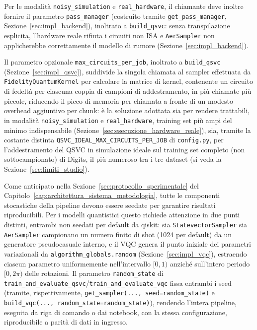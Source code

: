 Per le modalità \texttt{noisy\_simulation} e \texttt{real\_hardware}, il chiamante deve inoltre fornire il parametro \texttt{pass\_manager} (costruito tramite \texttt{get\_pass\_manager}, Sezione~\ref{sec:impl_backend}), inoltrato a \texttt{build\_qsvc}: senza transpilazione esplicita, l'hardware reale rifiuta i circuiti non ISA e \texttt{AerSampler} non applicherebbe correttamente il modello di rumore (Sezione~\ref{sec:impl_backend}).

Il parametro opzionale \texttt{max\_circuits\_per\_job}, inoltrato a \texttt{build\_qsvc} (Sezione~\ref{sec:impl_qsvc}), suddivide la singola chiamata al sampler effettuata da \newline\texttt{FidelityQuantumKernel} per calcolare la matrice di kernel, contenente un circuito di fedeltà per ciascuna coppia di campioni di addestramento, in più chiamate più piccole, riducendo il picco di memoria per chiamata a fronte di un modesto overhead aggiuntivo per chunk: è la soluzione adottata sia per rendere trattabili, in modalità \texttt{noisy\_simulation} e \texttt{real\_hardware}, training set più ampi del minimo indispensabile (Sezione~\ref{sec:esecuzione_hardware_reale}), sia, tramite la costante distinta \texttt{QSVC\_IDEAL\_MAX\_CIRCUITS\_PER\_JOB} di \texttt{config.py}, per l'addestramento del QSVC in simulazione ideale sul training set completo (non sottocampionato) di Digits, il più numeroso tra i tre dataset (si veda la Sezione~\ref{sec:limiti_studio}).

Come anticipato nella Sezione~\ref{sec:protocollo_sperimentale} del Capitolo~\ref{cap:architettura_sistema_metodologia}, tutte le componenti stocastiche della pipeline devono essere seedate per garantire risultati riproducibili. Per i modelli quantistici questo richiede attenzione in due punti distinti, entrambi non seedati per default da qiskit: sia \texttt{StatevectorSampler} sia \texttt{AerSampler} campionano un numero finito di shot (1024 per default) da un generatore pseudocasuale interno, e il VQC genera il punto iniziale dei parametri variazionali da \texttt{algorithm\_globals.random} (Sezione~\ref{sec:impl_vqc}), estraendo ciascun parametro uniformemente nell'intervallo $[0, 1)$ anziché sull'intero periodo $[0, 2\pi)$ delle rotazioni. Il parametro \texttt{random\_state} di \texttt{train\_and\_evaluate\_qsvc}/\texttt{train\_and\_evaluate\_vqc} fissa entrambi i seed (tramite, rispettivamente, \texttt{get\_sampler(..., seed=random\_state)} e \newline\texttt{build\_vqc(..., random\_state=random\_state)}), rendendo l'intera pipeline, \newline eseguita da riga di comando o dai notebook, con la stessa configurazione, riproducibile a parità di dati in ingresso.

